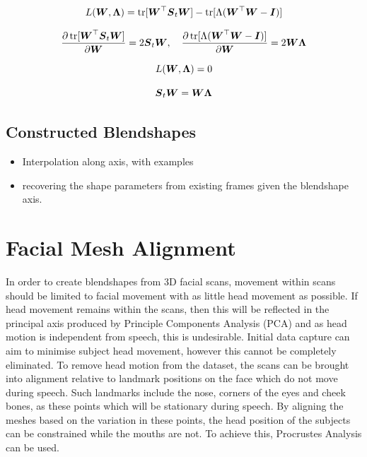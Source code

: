 \documentclass[12pt]{report}
\begin{document}
\begin{equation*}
    L({\boldsymbol{{W}}}, {\boldsymbol{{\Lambda}}}) = \operatorname{tr}[{\boldsymbol{{W}}}^\top {\boldsymbol{{S}}}_t {\boldsymbol{{W}}}] - \operatorname{tr}[\Lambda({\boldsymbol{{W}}}^\top {\boldsymbol{{W}}} - {\boldsymbol{{I}}})]
\end{equation*}

\begin{equation*}
    \frac{\partial \operatorname{tr}[{\boldsymbol{{W}}}^\top {\boldsymbol{{S}}}_t {\boldsymbol{{W}}}]}{\partial {\boldsymbol{{W}}}} = 2 {\boldsymbol{{S}}}_t {\boldsymbol{{W}}},
    \quad
    \frac{\partial \operatorname{tr}[\Lambda({\boldsymbol{{W}}}^\top {\boldsymbol{{W}}} - {\boldsymbol{{I}}})]}{\partial {\boldsymbol{{W}}}} = 2 {\boldsymbol{{W \Lambda}}}
\end{equation*}

\begin{equation*}
    L({\boldsymbol{{W}}}, {\boldsymbol{{\Lambda}}}) = 0 
\end{equation*}

\begin{equation} \label{eq:pca_solved}
    {\boldsymbol{{S}}}_t {\boldsymbol{{W}}} = {\boldsymbol{{W \Lambda}}}
\end{equation}

\subsection{Constructed Blendshapes}

\begin{itemize}
    \item Interpolation along axis, with examples
    \item recovering the shape parameters from existing frames given the blendshape axis.
\end{itemize}

\section{Facial Mesh Alignment}
In order to create blendshapes from 3D facial scans, movement within scans should be limited to facial movement with as little head movement as possible.
If head movement remains within the scans, then this will be reflected in the principal axis produced by Principle Components Analysis (PCA) and as head motion is independent from speech, this is undesirable.
Initial data capture can aim to minimise subject head movement, however this cannot be completely eliminated.
To remove head motion from the dataset, the scans can be brought into alignment relative to landmark positions on the face which do not move during speech.
Such landmarks include the nose, corners of the eyes and cheek bones, as these points which will be stationary during speech.
By aligning the meshes based on the variation in these points, the head position of the subjects can be constrained while the mouths are not.
To achieve this, Procrustes Analysis can be used.
\end{document}
